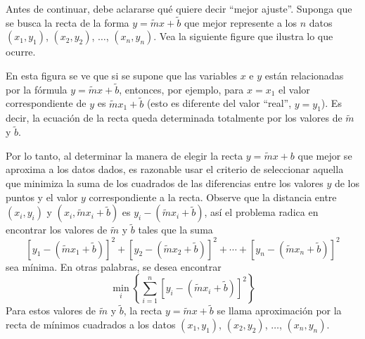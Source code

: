 Antes de continuar, debe aclararse qué quiere decir “mejor ajuste”. Suponga que se busca la recta de la forma $y = \tilde{m}x + \tilde{b}$ que mejor represente a los $n$ datos $(x_1, y_1)$, $(x_2, y_2)$, $\dots$, $(x_n, y_n)$. Vea la siguiente figure que ilustra lo que ocurre.
\begin{center}
\end{center}
En esta figura se ve que si se supone que las variables $x$ e $y$ están relacionadas por la fórmula $y = \tilde{m}x + \tilde{b}$, entonces, por ejemplo, para $x = x_1$ el valor correspondiente de $y$ es $\tilde{m}x_1 + \tilde{b}$ (esto es diferente del valor “real”, $y = y_1$). Es decir, la ecuación de la recta queda determinada totalmente por los valores de $\tilde{m}$ y $\tilde{b}$.

Por lo tanto, al determinar la manera de elegir la recta $y = \tilde{m}x + b$ que mejor se aproxima a los datos dados, es razonable usar el criterio de seleccionar aquella que minimiza la suma de los cuadrados de las diferencias entre los valores $y$ de los puntos y el valor $y$ correspondiente a la recta. Observe que la distancia entre $(x_i, y_i)$ y $\left(x_i, \tilde{m}x_i + \tilde{b}\right)$ es $y_i - \left(\tilde{m}x_i + \tilde{b}\right)$, así el problema radica en encontrar los valores de $\tilde{m}$ y $\tilde{b}$ tales que la suma
$$\left[ y_1 - \left(\tilde{m}x_1 + \tilde{b} \right) \right]^2 + \left[ y_2 - \left(\tilde{m}x_2 + \tilde{b} \right) \right]^2 + \cdots + \left[ y_n - \left(\tilde{m}x_n + \tilde{b} \right) \right]^2$$\newpage\noindent
sea mínima. En otras palabras, se desea encontrar
\begin{equation}
    \min_{i} \left\{ \sum_{i=1}^{n} \left[ y_i - \left(\tilde{m}x_i + \tilde{b} \right) \right]^2 \right\} \label{minimoscuadrados1}
\end{equation}
Para estos valores de $\tilde{m}$ y $\tilde{b}$, la recta $y = \tilde{m}x + \tilde{b}$ se llama aproximación por la recta de mínimos cuadrados a los datos $(x_1, y_1)$, $(x_2, y_2)$, $\dots$, $(x_n, y_n)$.

